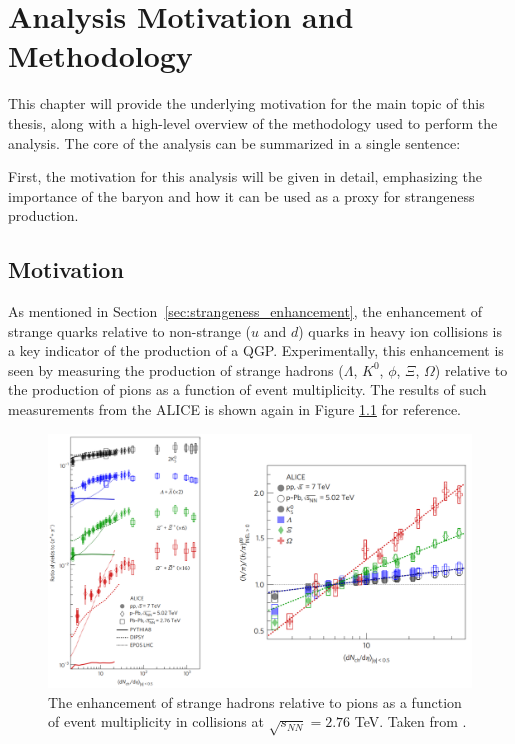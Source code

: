 \chapter{Analysis Motivation and Methodology}
\label{ch:analysis_mnm}

This chapter will provide the underlying motivation for the main topic of this thesis, along with a high-level overview of the methodology used to perform the analysis. The core of the analysis can be summarized in a single sentence:
\begin{center}
\end{center}
First, the motivation for this analysis will be given in detail, emphasizing the importance of the \lmb baryon and how it can be used as a proxy for strangeness production.

\section{Motivation}
As mentioned in Section~\ref{sec:strangeness_enhancement}, the enhancement of strange quarks relative to non-strange ($u$ and $d$) quarks in heavy ion collisions is a key indicator of the production of a QGP. Experimentally, this enhancement is seen by measuring the production of strange hadrons ($\Lambda$, $K^0$, $\phi$, $\Xi$, $\Omega$) relative to the production of pions as a function of event multiplicity. The results of such measurements from the ALICE is shown again in Figure \ref{fig:ref_enhancement} for reference. 

\begin{figure}
\centering
\includegraphics[width=\textwidth]{figures/introduction/strangeness_enhancement.png}
\caption{The enhancement of strange hadrons relative to pions as a function of event multiplicity in \PbPb collisions at $\sqrt{s_{NN}} = 2.76$ TeV. Taken from \cite{ALICE:2017jyt}.}
\label{fig:ref_enhancement}
\end{figure}

